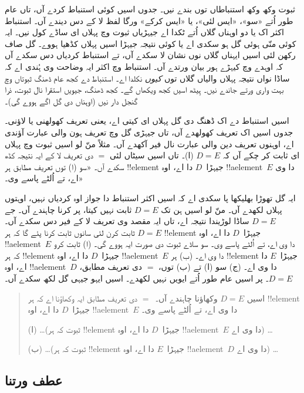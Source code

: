 \documentclass[../../../include/open-logic-section]{subfiles}
\begin{document}


ثبوت وکھ وکھ استنباطاں توں بندے نیں۔ جدوں اسیں کوئی استنباط کردے آں، تاں عام طور اُتے «سو»، «ایس لئی»، یا «ایس کرکے» ورگا لفظ لا کے دس دیندے آں۔ استنباط اکثر اک یا دو اوہناں گلاں اُتے ٹکدا اے جیہڑیاں ثبوت وچ پہلاں ای ساڈے کول نیں۔ ایہ کوئی منّی ہوئی گل ہو سکدی اے یا کوئی نتیجہ جیہڑا اسیں پہلاں کڈھیا ہووے۔ گل صاف رکھن لئی اسیں ایہناں گلاں نوں نشان لا سکدے آں، تے استنباط کردیاں دس سکدے آں کہ اوہدے وچ کیہڑے ہور بیان ورتدے آں۔ استنباط وچ اکثر ایہ وضاحت وی ہُندی اے کہ ساڈا نواں نتیجہ پہلاں والیاں گلاں توں \emph{کیوں} نکلدا اے۔ استنباط دے کجھ عام ڈھنگ ثبوتاں وچ بہت واری ورتے جاندے نیں۔ ہِیٹھ اسیں کجھ ویکھاں گے۔ کجھ ڈھنگ، جیویں استقرا نال ثبوت، ذرا گنجل دار نیں (اوہناں دی گل اگے ہووے گی)۔

اسیں استنباط دے اک ڈھنگ دی گل پہلاں ای کیتی اے، یعنی تعریف کھولھنی یا لاؤنی۔ جدوں اسیں اک تعریف کھولھدے آں، تاں جیہڑی گل وچ تعریف ہون والی عبارت آؤندی اے، اوہنوں تعریف دین والی عبارت نال فیر آکھدے آں۔ مثلاً منّ لو اسیں ثبوت وچ پہلاں ای ثابت کر چکے آں کہ $D = E$ (ا)۔ تاں اسیں سیٹاں لئی $=$ دی تعریف لا کے ایہ نتیجہ کڈھ سکدے آں۔ «سو (ا) توں تعریف مطابق ہر !!{element} جیہڑا~$D$ دا اے، اوہ !!a{element}~$E$ دا وی اے، تے اُلٹے پاسے وی۔»

ایہ گل تھوڑا بھلیکھا پا سکدی اے کہ اسیں اکثر استنباط دا جواز اوہ کردیاں نہیں، اوہتوں پہلاں لکھدے آں۔ منّ لو اسیں ہن تک $D = E$ ثابت نہیں کیتا، پر کرنا چاہندے آں۔ جے $D = E$ ساڈا لوڑیندا نتیجہ اے، تاں ایہ مقصد وی تعریف لا کے فیر دس سکدے آں۔ $D = E$ ثابت کرن لئی سانوں ثابت کرنا پئے گا کہ ہر !!{element} جیہڑا~$D$ دا اے، اوہ !!a{element}~$E$ دا وی اے، تے اُلٹے پاسے وی۔ سو ساڈے ثبوت دی صورت ایہ ہووے گی۔ (ا) ثابت کرو کہ ہر !!{element} جیہڑا~$D$ دا اے، اوہ !!a{element}~$E$ دا وی اے۔ (ب) ہر !!{element} جیہڑا~$E$ دا اے، اوہ !!a{element}~$D$ دا وی اے۔ (ج) سو (ا) تے (ب) توں، $=$ دی تعریف مطابق، $D = E$۔ پر اسیں عام طور اُتے ایویں نہیں لکھدے۔ اسیں ایہو جیہی گل لکھ سکدے آں۔
\begin{quote}
اسیں $D = E$ وکھاؤنا چاہندے آں۔~$=$ دی تعریف مطابق ایہ وکھاؤنا اے کہ ہر !!{element} جیہڑا~$D$ دا اے، اوہ !!a{element}~$E$ دا وی اے، تے اُلٹے پاسے وی۔

(ا) \dots (ثبوت کہ ہر !!{element} جیہڑا~$D$ دا اے، اوہ !!a{element}~$E$ دا وی اے) \dots

(ب) \dots (ثبوت کہ ہر !!{element} جیہڑا~$E$ دا اے، اوہ !!a{element}~$D$ دا وی اے) \dots
\end{quote}

\subsection{عطف ورتنا}
\end{document}

